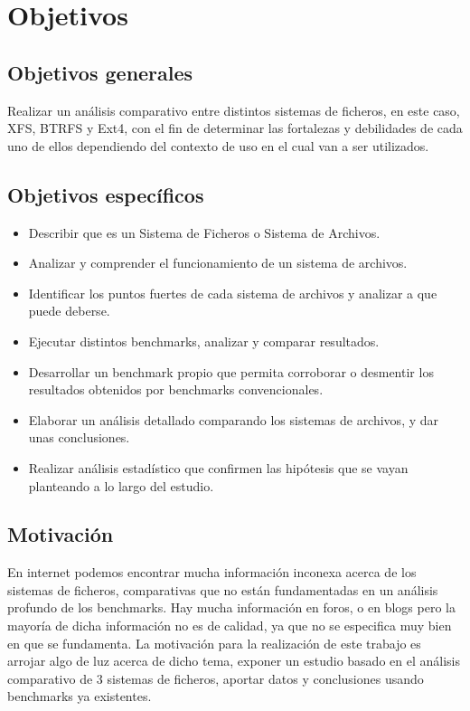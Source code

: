 \section{Objetivos}

\subsection{Objetivos generales}
Realizar un análisis comparativo entre distintos sistemas de ficheros, en este caso, XFS, BTRFS y Ext4, con el fin de determinar las fortalezas y debilidades de cada uno de ellos dependiendo del contexto de uso en el cual van a ser utilizados.


\subsection{Objetivos específicos}
\begin{itemize}
    \item Describir que es un Sistema de Ficheros o Sistema de Archivos.
    \item Analizar y comprender el funcionamiento de un sistema de archivos.
    \item Identificar los puntos fuertes de cada sistema de archivos y analizar a que puede deberse.
    \item Ejecutar distintos benchmarks, analizar y comparar resultados.
    \item Desarrollar un benchmark propio que permita corroborar o desmentir los resultados obtenidos por benchmarks convencionales.
    \item Elaborar un análisis detallado comparando los sistemas de archivos, y dar unas conclusiones.
    \item Realizar análisis estadístico que confirmen las hipótesis que se vayan planteando a lo largo del estudio.
\end{itemize}

\subsection{Motivación}
En internet podemos encontrar mucha información inconexa acerca de los sistemas de ficheros, comparativas que no están fundamentadas en un análisis profundo de los benchmarks. Hay mucha información en foros, o en blogs pero la mayoría de dicha información no es de calidad, ya que no se especifica muy bien en que se fundamenta. La motivación para la realización de este trabajo es arrojar algo de luz acerca de dicho tema, exponer un estudio basado en el análisis comparativo de 3 sistemas de ficheros, aportar datos y conclusiones usando benchmarks ya existentes. 





